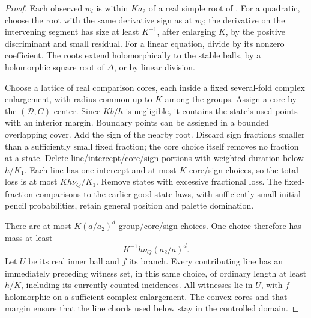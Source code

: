 \begin{proof}
Each observed \(w_l\) is within \(Ka_2\) of a real simple root
of . For a quadratic, choose the root
with the same derivative sign as at \(w_l\); the derivative on
the intervening segment has size at least \(K^{-1}\), after
enlarging \(K\), by the positive discriminant and small residual.
For a linear equation, divide by its nonzero coefficient.
The roots extend holomorphically to the stable balls, by a
holomorphic square root of \(\Delta\), or by linear division.

Choose a lattice of real comparison cores, each inside a
fixed several-fold complex enlargement, with radius common
up to \(K\) among the groups. Assign a core by the
\((\mathcal D,C)\)-center. Since \(Kb/h\) is negligible, it
contains the state's used points with an interior margin.
Boundary points can be assigned in a bounded overlapping cover.
Add the sign of the nearby root.
Discard sign fractions smaller than a sufficiently small fixed
fraction; the core choice itself removes no fraction at a state.
Delete line/intercept/core/sign portions with weighted duration
below \(h/K_1\). Each line has one intercept and at most \(K\)
core/sign choices, so the total loss is at most
\(Kh\nu_Q/K_1\). Remove states with excessive fractional loss.
The fixed-fraction comparisons to the earlier good state laws,
with sufficiently small initial pencil probabilities, retain
general position and palette domination.

There are at most \(K(a/a_2)^d\) group/core/sign choices.
One choice therefore has mass at least
\begin{equation}\label{a05:branch-mass}
 K^{-1}h\nu_Q(a_2/a)^d.
\end{equation}
Let \(U\) be its real inner ball and \(f\) its branch.
Every contributing line has an immediately preceding witness
set, in this same choice, of ordinary length at least \(h/K\),
including its currently counted incidences.
All witnesses lie in \(U\), with \(f\) holomorphic on a
sufficient complex enlargement. The convex cores and that
margin ensure that the line chords used below stay in the
controlled domain.


\end{proof}
